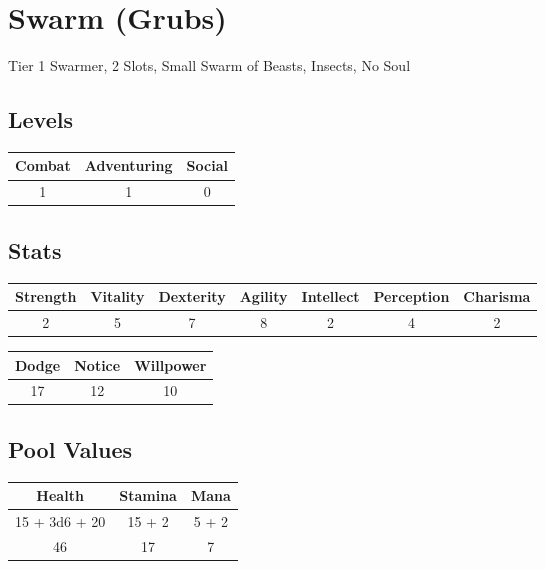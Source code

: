 \section{Swarm (Grubs)}
Tier 1 Swarmer, 2 Slots, Small Swarm of Beasts, Insects, No Soul\\

\subsection{Levels}
\begin{minipage}[H]{1\textwidth}
	\centering
	\begin{tabular}[c]{|c | c | c|}
		\hline
		Combat & Adventuring & Social\\
		\hline
		1 & 1 & 0\\
		\hline
	\end{tabular}
\end{minipage}

\subsection{Stats}
\begin{minipage}[H]{1\textwidth}
	\centering
	\begin{tabular}[c]{|c | c | c | c | c | c | c|}
		\hline
		Strength & Vitality & Dexterity & Agility & Intellect & Perception & Charisma\\
		\hline
		2 & 5 & 7 & 8 & 2 & 4 & 2\\
		\hline
	\end{tabular}
\end{minipage}
\bigbreak

\begin{minipage}[H]{1\textwidth}
	\centering
	\begin{tabular}[c]{|c | c | c|}
		\hline
		Dodge & Notice & Willpower\\
		\hline
		17 & 12 & 10\\
		\hline
	\end{tabular}
\end{minipage}

\subsection{Pool Values}
\bigbreak
\begin{minipage}[H]{1\textwidth}
	\centering
	\begin{tabular}[c]{|c | c | c|}
		\hline
		Health & Stamina & Mana\\
		\hline
		15 + 3d6 + 20 & 15 + 2 & 5 + 2 \\
		46 & 17 & 7\\
		\hline
	\end{tabular}
\end{minipage}
\noindent

